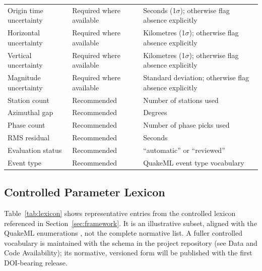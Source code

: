 \documentclass[11pt]{article}
\begin{document}
\begin{table}[H]
\begin{tabular}{p{3.2cm} p{2.3cm} p{7.7cm}}
Origin time uncertainty & Required where available & Seconds (1$\sigma$); otherwise flag absence explicitly \\
Horizontal uncertainty & Required where available & Kilometres (1$\sigma$); otherwise flag absence explicitly \\
Vertical uncertainty & Required where available & Kilometres (1$\sigma$); otherwise flag absence explicitly \\
Magnitude uncertainty & Required where available & Standard deviation; otherwise flag absence explicitly \\
Station count & Recommended & Number of stations used \\
Azimuthal gap & Recommended & Degrees \\
Phase count & Recommended & Number of phase picks used \\
RMS residual & Recommended & Seconds \\
Evaluation status & Recommended & ``automatic'' or ``reviewed'' \\
Event type & Recommended & QuakeML event type vocabulary \\
\bottomrule
\end{tabular}
\end{table}

\subsection{Controlled Parameter Lexicon}
Table~\ref{tab:lexicon} shows representative entries from the controlled lexicon referenced in Section~\ref{sec:framework}. It is an illustrative subset, aligned with the QuakeML enumerations \citep{QuakeML, EventTypeNotes}, not the complete normative list. A fuller controlled vocabulary is maintained with the schema in the project repository (see Data and Code Availability); its normative, versioned form will be published with the first DOI-bearing release.
\end{document}
